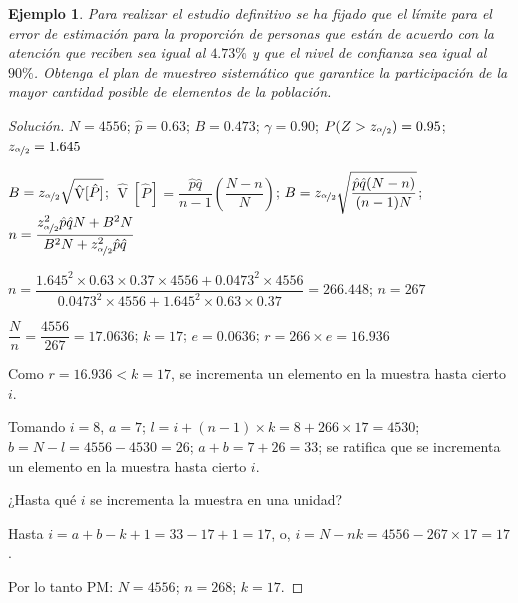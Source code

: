 \documentclass[a5paper,doc,10pt,noapacite]{apa6}
\DeclareMathOperator{\Var}{V}
\newtheorem{ejem}{Ejemplo}
\begin{document}
{{\begin{ejem}
	Para realizar el estudio definitivo se ha fijado que el límite para el error de estimación para la proporción de personas que están de acuerdo con la atención que reciben sea igual al \(4.73\%\) y que el nivel de confianza sea igual al \(90\%\). Obtenga el plan de muestreo sistemático que garantice la participación de la mayor cantidad posible de elementos de la población.
\end{ejem}
\begin{proof}[Solución]
		\(N=4556\); \(\hat{p}=0.63\); \(B=0.473\); \(\gamma=0.90\); \(P(Z>z_{\nicefrac{\alpha}{2}})=0.95\); \(z_{\nicefrac{\alpha}{2}}=1.645\)
		
		\(B=z_{\nicefrac{\alpha}{2}}\sqrt{\hat{\Var}[\hat{P}]}\); \(\hat{\Var}[\hat{P}]=\dfrac{\hat{p}\hat{q}}{n-1}\left(\dfrac{N-n}{N}\right)\); \(B=z_{\nicefrac{\alpha}{2}}\sqrt{\dfrac{\hat{p}\hat{q}(N-n)}{(n-1)N}}\); \(n=\dfrac{z_{\nicefrac{\alpha}{2}}^2\hat{p}\hat{q} N+B^2N}{B^2N+z_{\nicefrac{\alpha}{2}}^2\hat{p}\hat{q}}\)
		
		\(n=\dfrac{1.645^2 \times 0.63 \times 0.37 \times 4556+0.0473^2 \times 4556}{0.0473^2 \times 4556+1.645^2 \times 0.63 \times 0.37}=266.448\); \(n=267\)
		
		\(\dfrac{N}{n}=\dfrac{4556}{267}=17.0636\); \(k=17\); \(e=0.0636\); \(r=266 \times e=16.936\)
		
		Como \(r=16.936<k=17\), se incrementa un elemento en la muestra hasta cierto \(i\).
		
		Tomando \(i=8\), \(a=7\); \(l=i+(n-1) \times k=8+266 \times 17=4530\); \(b=N-l=4556-4530=26\); \(a+b=7+26=33\); se ratifica que se incrementa un elemento en la muestra hasta cierto  \(i\).
		
		¿Hasta qué \(i\) se incrementa la muestra en una unidad?
		
		Hasta \(i=a+b-k+1=33-17+1=17\), o, \(i=N-nk=4556-267 \times 17=17\).
		
		Por lo tanto PM: \(N=4556\); \(n=268\); \(k=17\).
\end{proof}


\nocite{E-1, E-2, E-3, E-4, E-5}
}

\newpage




}
\end{document}
